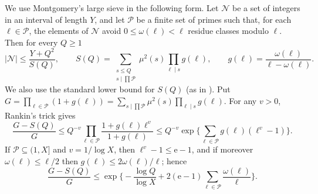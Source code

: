 \documentclass[11pt,reqno]{amsart}
\newcommand{\e}{\mathrm e}
\newcommand{\cN}{\mathcal N}
\begin{document}
We use Montgomery's large sieve \cite[\S8, p.~561]{Montgomery} in the following
form.  Let $\cN$ be a set of integers in an interval of length $Y$, and let
$\mathcal P$ be a finite set of primes such that, for each $\ell\in\mathcal P$, the
elements of $\cN$ avoid $0\le\omega(\ell)<\ell$ residue classes modulo $\ell$.  Then
for every $Q\ge1$
\begin{equation}\label{LS}
 |\cN|\le\frac{Y+Q^2}{S(Q)},\qquad
 S(Q)=\sum_{\substack{s\le Q\\ s\mid\prod\mathcal P}}\mu^2(s)\prod_{\ell\mid s}g(\ell),
 \qquad g(\ell)=\frac{\omega(\ell)}{\ell-\omega(\ell)} .
\end{equation}
We also use the standard lower bound for $S(Q)$ (as in \cite[\S4]{PW}).  Put
$G=\prod_{\ell\in\mathcal P}(1+g(\ell))=\sum_{s\mid\prod\mathcal P}\mu^2(s)\prod_{\ell\mid s}g(\ell)$.
For any $v>0$, Rankin's trick gives
\[
 \frac{G-S(Q)}{G}\le Q^{-v}\prod_{\ell\in\mathcal P}\frac{1+g(\ell)\ell^{v}}{1+g(\ell)}
 \le Q^{-v}\exp\Big\{\sum_{\ell\in\mathcal P}g(\ell)(\ell^v-1)\Big\}.
\]
If $\mathcal P\subseteq(1,X]$ and $v=1/\log X$, then $\ell^v-1\le\e-1$, and
if moreover $\omega(\ell)\le\ell/2$ then $g(\ell)\le2\omega(\ell)/\ell$; hence
\begin{equation}\label{tail}
 \frac{G-S(Q)}{G}\le\exp\Big\{-\frac{\log Q}{\log X}+2(\e-1)\sum_{\ell\in\mathcal P}\frac{\omega(\ell)}\ell\Big\}.
\end{equation}
\end{document}

